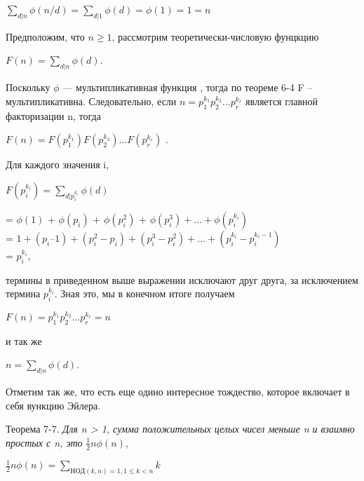 \documentclass[12pt]{article}
\begin{document}
	\begin{center}
		$\sum_{d|n}\phi(n/d) = \sum_{d|1}\phi(d) = \phi(1) = 1 = \textit{n}$	
	\end{center}
	
	
	Предположим, что $n \geq 1$, рассмотрим теоретически-числовую фунцкцию
	
	\begin{center}
		$F(n) = \sum_{d|n}\phi(d)$.	
	\end{center}
	
	
	Поскольку $\phi$ — мультипликативная функция , тогда по теореме 6-4 F – мультипликативна. Следовательно, если $n = p_1^{k_{1}}p_2^{k_{2}} … p_r^{k_{r}}$  является главной факторизации n, тогда 
	
	\begin{center}
		$F(n) = F(p_1^{k_{1}})F(p_2^{k_{2}})...F(p_r^{k_{r}})$ .	
	\end{center}
	
	
	Для каждого значения i,
	
	$F(p_i^{k_{i}}) =  \sum_{d|p_i^{k_{i}}}\phi(d)$	
	
	\begin{center}
		= $\phi(1)$ + $\phi(p_i)$ + $\phi(p_i^2)$ + $\phi(p_i^3)+ … + \phi(p_i^{k_{i}})$ \\
		= $1 + (p_i – 1) + (p_i^2  - p_i) + (p_i^3  - p_i^2 ) + … + (p_i^{k_{i}}  - p_i^{k_{i} - 1})$ \\
		= $p_i^{k_{i}}$,	
	\end{center}
	
	
	термины в приведенном выше выражении исключают друг друга, за исключением термина  $p_i^{k_{i}}$. Зная это, мы в конечном итоге получаем
	
	\begin{center}
		$F(n) = p_1^{k_{1}}p_2^{k_{2}}...p_r^{k_{r}} = \textit{n}$	
	\end{center}
	
	
	и так же 
	
	\begin{center}
		$n = \sum_{d|n}\phi(d)$.	
	\end{center}
	
	
	Отметим так же, что есть еще одино интересное тождество, которое включает в себя вункцию Эйлера.
	
	Теорема 7-7. \textit{Для  n > 1, сумма положительных целых чисел меньше n и взаимно простых с n, это} $\frac{1}{2}n\phi(n)$,
	
	\begin{center}
		$\frac{1}{2}n\phi(n) = 
		\sum_{НОД(k, n) = 1, 1 \leq k < n}k$	
	\end{center}
	
\end{document}
